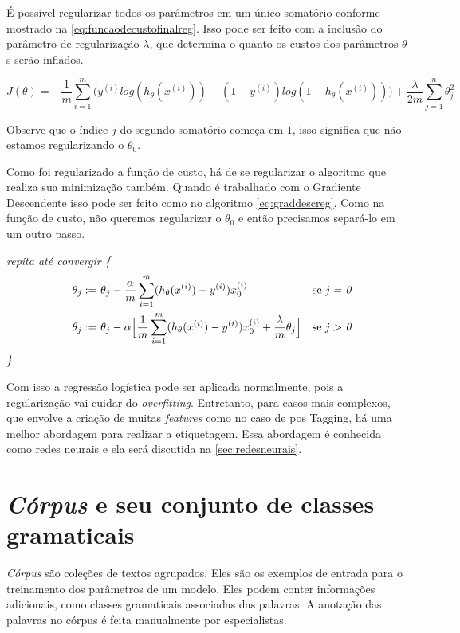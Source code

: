 É possível regularizar todos os parâmetros em um único somatório conforme mostrado na \autoref{eq:funcaodecustofinalreg}. Isso pode ser feito com a inclusão do parâmetro de regularização $\lambda$, que determina o quanto os custos dos parâmetros $\theta$s serão inflados.

\begin{equation} \label{eq:funcaodecustofinalreg}
J(\theta) = - \frac{1}{m}\sum\limits_{i=1}^{m}\Big( y^{(i)}log(h_{\theta}(x^{(i)})) + (1-y^{(i)})log(1 - h_{\theta}(x^{(i)})) \Big)
+ \frac{\lambda}{2m}\sum\limits_{j=1}^{n} \theta_j^2
\end{equation}

Observe que o índice $j$ do segundo somatório começa em $1$, isso significa que não estamos regularizando o $\theta_0$.

Como foi regularizado a função de custo, há de se regularizar o algoritmo que realiza sua minimização também. Quando é trabalhado com o Gradiente Descendente isso pode ser feito como no algoritmo \ref{eq:graddescreg}. Como na função de custo, não queremos regularizar o $\theta_0$ e então precisamos separá-lo em um outro passo.

\textit{repita até convergir \{}
\begin{align} 
\quad \theta_j := &\ \theta_j - \frac{\alpha}{m} \sum\limits_{i=1}^{m}(h_{\theta}(x^{(i)}) - y^{(i)}) x_0^{(i)} & \text{se \textit{j = 0}} \nonumber \\
\quad \theta_j := &\ \theta_j - \alpha \Big[ \frac{1}{m} \sum\limits_{i=1}^{m} (h_{\theta}(x^{(i)}) - y^{(i)}) x_0^{(i)} + \frac{\lambda}{m}\theta_j \Big] & \text{se \textit{j > 0}} \label{eq:graddescreg}
\end{align}
\textit{\quad\quad\quad \}}

Com isso a regressão logística pode ser aplicada normalmente, pois a regularização vai cuidar do \textit{overfitting}. Entretanto, para casos mais complexos, que envolve a criação de muitas \textit{features} como no caso de \ac{pos} Tagging, há uma melhor abordagem para realizar a etiquetagem. Essa abordagem é conhecida como redes neurais e ela será discutida na \autoref{sec:redesneurais}.


\section{\textit{Córpus} e seu conjunto de classes gramaticais}

\textit{Córpus} são coleções de textos agrupados. Eles são os exemplos de entrada para o treinamento dos parâmetros de um modelo. Eles podem conter informações adicionais, como classes gramaticais associadas das palavras. A anotação das palavras no córpus é feita manualmente por especialistas.

